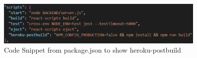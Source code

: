 \begin{figure}[h!]
    \centering
    \includegraphics[width=0.9\textwidth]{images/heroku-build.png}
    \caption{Code Snippet from package.json to show heroku-postbuild}
    \label{image:heroku-build}
\end{figure}